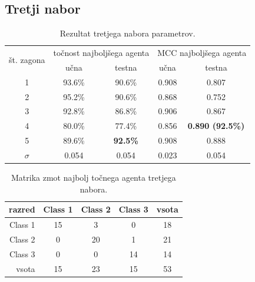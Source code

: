\subsection{Tretji nabor}\label{subsec:dodatek-wine-tretji-nabor}
\begin{table}[H]
    \begin{center}
        \begin{tabular}{|| c | c c || c c ||}
            \hline
            \multirow{2}{*}{št. zagona} & \multicolumn{2}{c||}{točnost najboljšega agenta} & \multicolumn{2}{c||}{MCC najboljšega agenta} \\ \cline{2-5}
            & učna   & testna          & učna  & testna                  \\
            \hline
            1        & 93.6\% & 90.6\%          & 0.908 & 0.807                   \\
            \hline
            2        & 95.2\% & 90.6\%          & 0.868 & 0.752                   \\
            \hline
            3        & 92.8\% & 86.8\%          & 0.906 & 0.867                   \\
            \hline
            4        & 80.0\% & 77.4\%          & 0.856 & \textbf{0.890 (92.5\%)} \\
            \hline
            5        & 89.6\% & \textbf{92.5\%} & 0.908 & 0.888                   \\
            \hline
            $\sigma$ & 0.054  & 0.054           & 0.023 & 0.054                   \\
            \hline
        \end{tabular}
    \end{center}
    \caption{Rezultat tretjega nabora parametrov.}
    \label{tab:wine_result_3}
\end{table}

\begin{table}[H]
    \centering
    \begin{tabular}{||rcccc||}
        \hline
        razred  & Class 1 & Class 2 & Class 3 & vsota \\ \hline
        Class 1 & 15      & 3       & 0       & 18    \\ \hline
        Class 2 & 0       & 20      & 1       & 21    \\ \hline
        Class 3 & 0       & 0       & 14      & 14    \\ \hline
        vsota   & 15      & 23      & 15      & 53    \\ \hline
    \end{tabular}
    \caption{Matrika zmot najbolj točnega agenta tretjega nabora.}
    \label{tab:wine_acc_3}
\end{table}

